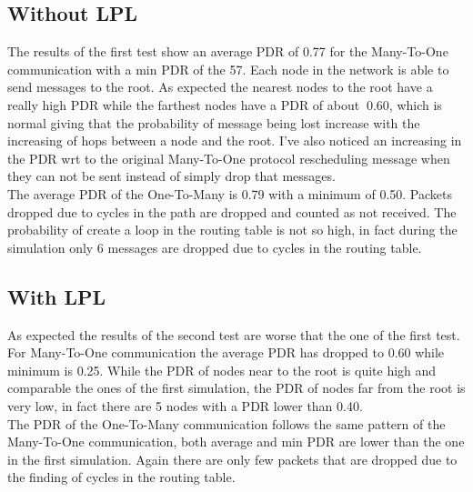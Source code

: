 \documentclass{article}
\begin{document}
\subsection{Without LPL}
The results of the first test show an average PDR of 0.77 for the Many-To-One communication with a min PDR of the 57. Each node in the network is able to send messages to the root. As expected the nearest nodes to the root have a really high PDR while the farthest nodes have a PDR of about $~$0.60, which is normal giving that the probability of message being lost increase with the increasing of hops between a node and the root. I've also noticed an increasing in the PDR wrt to the original Many-To-One protocol rescheduling message when they can not be sent instead of simply drop that messages.\\
The average PDR of the One-To-Many is 0.79 with a minimum of 0.50. Packets dropped due to cycles in the path are dropped and counted as not received. The probability of create a loop in the routing table is not so high, in fact during the simulation only 6 messages are dropped due to cycles in the routing table.\\
\subsection{With LPL}
As expected the results of the second test are worse that the one of the first test. For Many-To-One communication the average PDR has dropped to 0.60 while minimum is 0.25. While the PDR of nodes near to the root is quite high and comparable the ones of the first simulation, the PDR of nodes far from the root is very low, in fact there are 5 nodes with a PDR lower than 0.40. \\
The PDR of the One-To-Many communication follows the same pattern of the Many-To-One communication, both average and min PDR are lower than the one in the first simulation. Again there are only few packets that are dropped due to the finding of cycles in the routing table.\\
\end{document}
